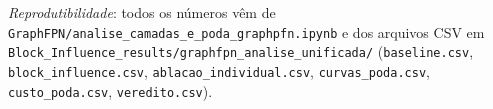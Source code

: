 \documentclass[11pt,a4paper]{article}
\begin{document}
\vspace{1em}
\noindent\small\textit{Reprodutibilidade}: todos os números vêm de \texttt{GraphFPN/analise\_camadas\_e\_poda\_graphpfn.ipynb} e dos arquivos CSV em \texttt{Block\_Influence\_results/graphfpn\_analise\_unificada/} (\texttt{baseline.csv}, \texttt{block\_influence.csv}, \texttt{ablacao\_individual.csv}, \texttt{curvas\_poda.csv}, \texttt{custo\_poda.csv}, \texttt{veredito.csv}).
\end{document}
